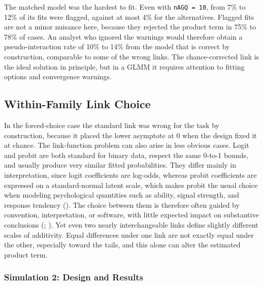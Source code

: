 \documentclass[
  man,
  floatsintext,
  longtable,
  nolmodern,
  notxfonts,
  notimes,
  colorlinks=true,linkcolor=blue,citecolor=blue,urlcolor=blue]{apa7}
\begin{document}
The matched model was the hardest to fit. Even with
\texttt{nAGQ\ =\ 10}, from 7\% to 12\% of its fits were flagged, against
at most 4\% for the alternatives. Flagged fits are not a minor nuisance
here, because they rejected the product term in 75\% to 78\% of cases.
An analyst who ignored the warnings would therefore obtain a
pseudo-interaction rate of 10\% to 14\% from the model that is correct
by construction, comparable to some of the wrong links. The
chance-corrected link is the ideal solution in principle, but in a GLMM
it requires attention to fitting options and convergence warnings.

\FloatBarrier

\subsection{Within-Family Link Choice}\label{within-family-link-choice}

In the forced-choice case the standard link was wrong for the task by
construction, because it placed the lower asymptote at 0 when the design
fixed it at chance. The link-function problem can also arise in less
obvious cases. Logit and probit are both standard for binary data,
respect the same 0-to-1 bounds, and usually produce very similar fitted
probabilities. They differ mainly in interpretation, since logit
coefficients are log-odds, whereas probit coefficients are expressed on
a standard-normal latent scale, which makes probit the usual choice when
modeling psychological quantities such as ability, signal strength, and
response tendency ().
The choice between them is therefore often guided by convention,
interpretation, or software, with little expected impact on substantive
conclusions (;
). Yet even two nearly
interchangeable links define slightly different scales of additivity.
Equal differences under one link are not exactly equal under the other,
especially toward the tails, and this alone can alter the estimated
product term.

\subsubsection{Simulation 2: Design and
Results}\label{simulation-2-design-and-results}
\end{document}

